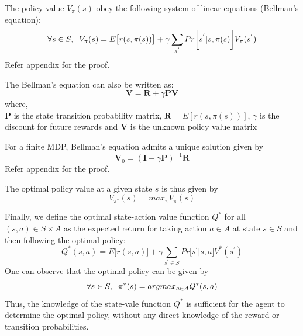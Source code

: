 \documentclass[conference]{IEEEtran}
\begin{document}
The policy value  $V_{\pi}(s)$ obey the following system of linear equations (Bellman's equation):
\begin{equation} \label{eq:bellman}
\forall s \in S,\hspace{0.2cm} V_{\pi}(s) = E\big[ r(s,\pi(s))\big] + \gamma \sum_{s^{'}} Pr\bigg[s^{'}|s,\pi(s) \bigg] V_{\pi}(s^{'}) 
\end{equation}
Refer appendix for the proof.

The Bellman's equation can also be written as:
\begin{equation} \label{eq:bellman2}
\textbf{V} = \textbf{R} + \gamma \textbf{PV}
\end{equation}
where,\\ 
$\textbf{P}$ is the state transition probability matrix, 
$\textbf{R} = E[r(s,\pi(s))]$, 
$\gamma$ is the discount for future rewards and $\textbf{V}$ is the unknown policy value matrix

For a finite MDP, Bellman's equation admits a unique solution given by
\begin{equation} \label{eq:bellmanSol}
\textbf{V}_{0} = (\textbf{I}-\gamma \textbf{P})^{-1} \textbf{R} 
\end{equation}
Refer appendix for the proof.

The optimal policy value at a given state $s$ is thus given by 
\begin{equation} \label{eq:optPolVal}
V_{\pi^{*}}(s) = max_{\pi} V_{\pi}(s)
\end{equation}

Finally, we define the optimal state-action value function $Q^{*}$ for all $(s,a) \in S \times A$  as the expected return for taking action $a \in A$ at state $s \in S$ and then following the optimal policy:
\begin{equation} \label{eq:optimalPol}
Q^{*}(s,a) = E\big[ r(s,a) \big]  + \gamma \sum_{s^{'} \in S} Pr\big[  s^{'} | s, a \big]  V^{*}(s^{'}) 
\end{equation}
One can observe that the optimal policy can be given by
\begin{equation} \label{eq:optimalPolObs}
 \forall s \in S,\hspace{0.2cm} \pi^{*}(s) = argmax_{a \in A} Q^{*}(s,a) 
\end{equation}
Thus, the knowledge of the state-vale function $Q^{*}$ is sufficient for the agent to determine the optimal policy, without any direct knowledge of the reward or transition probabilities.
\end{document}
